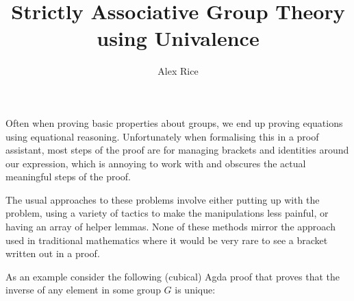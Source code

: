\documentclass{article}
\title{Strictly Associative Group Theory using Univalence}
\author{Alex Rice}
\begin{document}
\maketitle

Often when proving basic properties about groups, we end up proving equations using equational reasoning. Unfortunately when formalising this in a proof assistant, most steps of the proof are for managing brackets and identities around our expression, which is annoying to work with and obscures the actual meaningful steps of the proof.

The usual approaches to these problems involve either putting up with the problem, using a variety of tactics to make the manipulations less painful, or having an array of helper lemmas. None of these methods mirror the approach used in traditional mathematics where it would be very rare to see a bracket written out in a proof.

As an example consider the following (cubical) Agda proof that proves that the inverse of any element in some group \(G\) is unique:

\begin{code}[hide]%
\>[0]\AgdaSpace{}%
\AgdaSpace{}%
\<%
\\
\>[0]\AgdaSpace{}%
\AgdaSpace{}%
\<%
\\
\>[0]\AgdaSpace{}%
\AgdaSpace{}%
\<%
\\
\>[0]\AgdaSpace{}%
\AgdaSpace{}%
\<%
\\
\>[0]\AgdaSpace{}%
\AgdaSpace{}%
\<%
\\
\>[0]\AgdaSpace{}%
\AgdaSpace{}%
\<%
\end{code}
\end{document}
